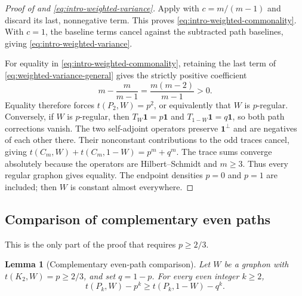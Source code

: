 \documentclass[11pt]{article}
\newtheorem{lemma}[theorem]{Lemma}
\numberwithin{equation}{section}
\newcommand{\one}{\mathbf 1}
\newcommand{\tC}[2]{t(C_{#1},#2)}
\newcommand{\tP}[2]{t(P_{#1},#2)}
\newcommand{\edens}[1]{t(K_{2},#1)}
\newcommand{\Tker}[1]{T_{#1}}
\begin{document}
\begin{proof}[Proof of  and
\eqref{eq:intro-weighted-variance}]
  Apply  with $c=m/(m-1)$ and discard
  its last, nonnegative term. This proves
  \eqref{eq:intro-weighted-commonality}. With $c=1$, the baseline
  terms cancel against the subtracted path baselines, giving
  \eqref{eq:intro-weighted-variance}.

  For equality in \eqref{eq:intro-weighted-commonality}, retaining
  the last term of \eqref{eq:weighted-variance-general} gives the
  strictly positive coefficient
  \[
    m-\frac{m}{m-1}=\frac{m(m-2)}{m-1}>0.
  \]
  Equality therefore forces $\tP2W=p^2$, or equivalently that
  $W$ is $p$-regular. Conversely, if $W$ is $p$-regular, then
  $\Tker W\one=p\one$ and
  $\Tker{1-W}\one=q\one$, so both path corrections vanish.
  The two self-adjoint operators preserve $\one^\perp$ and are
  negatives of each other there. Their nonconstant contributions
  to the odd traces cancel, giving
  $\tC mW+\tC m{1-W}=p^m+q^m$. The trace sums converge absolutely
  because the operators are Hilbert--Schmidt and $m\ge3$.
  Thus every regular graphon gives equality. The endpoint densities
  $p=0$ and $p=1$ are included; then $W$ is constant almost
  everywhere.
\end{proof}

\subsection{Comparison of complementary even paths}
\label{sec:dense-paths}

This is the only part of the proof that requires $p\ge2/3$.

\begin{lemma}[Complementary even-path comparison]
\label{lem:dense-path-comparison}
  Let $W$ be a graphon with $\edens W=p\ge2/3$, and set $q=1-p$.
  For every even integer $k\ge2$,
  \begin{equation}\label{eq:dense-path-comparison}
    \tP kW-p^k\ge\tP k{1-W}-q^k.
  \end{equation}
\end{lemma}
\end{document}

